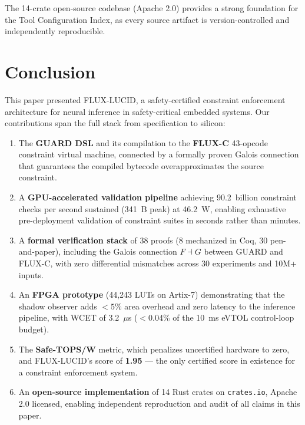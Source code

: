 \documentclass[conference]{IEEEtran}
\begin{document}
{The 14-crate open-source codebase (Apache 2.0) provides a strong
foundation for the Tool Configuration Index, as every source artifact
is version-controlled and independently reproducible.


\section{Conclusion}
\label{sec:conclusion}

This paper presented FLUX-LUCID, a safety-certified constraint
enforcement architecture for neural inference in safety-critical
embedded systems. Our contributions span the full stack from
specification to silicon:

\begin{enumerate}
  \item The \textbf{GUARD DSL} and its compilation to the
        \textbf{FLUX-C} 43-opcode constraint virtual machine, connected
        by a formally proven Galois connection that guarantees
        the compiled bytecode overapproximates the source constraint.
  \item A \textbf{GPU-accelerated validation pipeline} achieving
        90.2~billion constraint checks per second sustained (341~B peak)
        at 46.2~W, enabling exhaustive pre-deployment validation of
        constraint suites in seconds rather than minutes.
  \item A \textbf{formal verification stack} of 38 proofs (8 mechanized
        in Coq, 30 pen-and-paper), including the Galois connection
        $F \dashv G$ between GUARD and FLUX-C, with zero differential
        mismatches across 30 experiments and 10M+ inputs.
  \item An \textbf{FPGA prototype} (44,243 LUTs on Artix-7) demonstrating
        that the shadow observer adds $< 5\%$ area overhead and zero
        latency to the inference pipeline, with WCET of 3.2~$\mu$s
        ($<$0.04\% of the 10~ms eVTOL control-loop budget).
  \item The \textbf{Safe-TOPS/W} metric, which penalizes uncertified
        hardware to zero, and FLUX-LUCID's score of \textbf{1.95}
        — the only certified score in existence for a constraint
        enforcement system.
  \item An \textbf{open-source implementation} of 14 Rust crates on
        \texttt{crates.io}, Apache 2.0 licensed, enabling independent
        reproduction and audit of all claims in this paper.
\end{enumerate}

}
\end{document}
